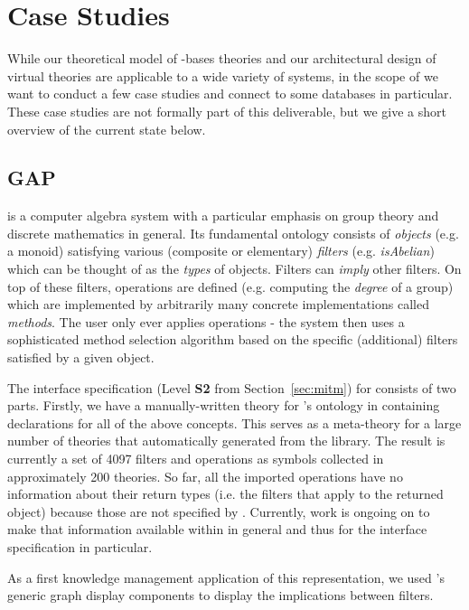 \section{Case Studies}\label{sec:cases}

While our theoretical model of \DKS-bases theories and our architectural design of virtual theories are applicable to a wide variety of systems, in the scope of \pn we want to conduct a few case studies and connect to some databases in particular.
These case studies are not formally part of this deliverable, but we give a short overview of the current state below.

\subsection{GAP}\label{sec:gap}
\GAP \cite{gap} is a computer algebra system with a particular emphasis on group theory and discrete mathematics in general. Its fundamental
ontology consists of \emph{objects} (e.g. a monoid) satisfying various (composite or elementary) \emph{filters} (e.g. \emph{isAbelian}) which
can be thought of as the \emph{types} of objects. Filters can \emph{imply} other filters.
On top of these filters, operations are defined (e.g. computing the \emph{degree} of a group) which are implemented by arbitrarily many concrete implementations
called \emph{methods}. The user only ever applies operations - the \GAP system then uses a sophisticated method selection algorithm based on
the specific (additional) filters satisfied by a given object.

The interface specification (Level \textbf{S2} from Section~\ref{sec:mitm}) for \GAP consists of two parts.
Firstly, we have a manually-written theory for \GAP's ontology in \MMT containing declarations for all of the above concepts.
This serves as a meta-theory for a large number of theories that automatically generated from the \GAP library.
The result is currently a set of 4097 filters and operations as \MMT symbols collected in approximately 200 theories.
So far, all the imported operations have no information about their return types (i.e. the filters that apply to the returned object) because those are not specified by \GAP.
Currently, work is ongoing on \GAP to make that information available within \GAP in general and thus for the interface specification in particular.

As a first knowledge management application of this representation, we used \MMT's generic graph display components to display the implications between \GAP filters.


